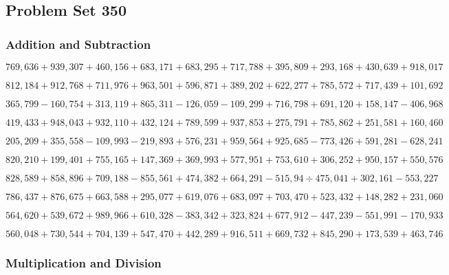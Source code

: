 \hypertarget{problem-set-350}{%
\subsection{Problem Set 350}\label{problem-set-350}}

\hypertarget{addition-and-subtraction}{%
\subsubsection{Addition and
Subtraction}\label{addition-and-subtraction}}

\(769,636+939,307+460,156+683,171+683,295+717,788+395,809+293,168+430,639+918,017\)

\(812,184+912,768+711,976+963,501+596,871+389,202+622,277+785,572+717,439+101,692\)

\(365,799-160,754+313,119+865,311-126,059-109,299+716,798+691,120+158,147-406,968\)

\(419,433+948,043+932,110+432,124+789,599+937,853+275,791+785,862+251,581+160,460\)

\(205,209+355,558-109,993-219,893+576,231+959,564+925,685-773,426+591,281-628,241\)

\(820,210+199,401+755,165+147,369+369,993+577,951+753,610+306,252+950,157+550,576\)

\(828,589+858,896+709,188-855,561+474,382+664,291-515,94÷475,041+302,161-553,227\)

\(786,437+876,675+663,588+295,077+619,076+683,097+703,470+523,432+148,282+231,060\)

\(564,620+539,672+989,966+610,328-383,342+323,824+677,912-447,239-551,991-170,933\)

\(560,048+730,544+704,139+547,470+442,289+916,511+669,732+845,290+173,539+463,746\)

\hypertarget{multiplication-and-division}{%
\subsubsection{Multiplication and
Division}\label{multiplication-and-division}}

